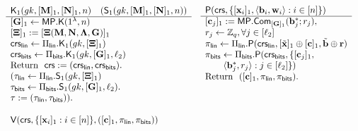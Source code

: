  
   
\begin{figure}
\begin{\algSize}
$$
\begin{array}{ll}
\begin{array}{l}
\algK_1(\gk,[\matr{M}]_1,[\matr{N}]_1,n)
\quad (\mathsf{S}_1(\gk,[\matr{M}]_1,[\matr{N}]_1,n))
\\
\hline
[\matr{G}]_1 \gets \MP.\algK(1^\lambda,n)\\
{[\matr{\Xi}]_1 := [\matr{\Xi}(\matr{M},\matr{N},\matr{\Lambda},\matr{G})]_1}\\
\crs_\sflin\gets\Pi_\sflin.\algK_1(\gk,[\matr{\Xi}]_1)\\
\crs_\sfbits\gets\Pi_\sfbits.\algK_1(\gk,[\matr{G}]_1,\lb)\\
\text{Return } \ \crs:=(\crs_\sflin,\crs_\sfbits).\\
(\tau_\sflin\gets\Pi_\sflin.\algS_1(\gk,[\matr{\Xi}]_1)\\
\tau_\sfbits\gets\Pi_\sfbits.\algS_1(\gk,[\matr{G}]_1,\lb).\\
\tau := (\tau_\sflin,\tau_\sfbits)).\\
\\
\end{array}
&
\begin{array}{l}
{\algP(\mathsf{crs}, \{[\vecb{x}_i]_1,\langle \vecb{b}_i,\vecb{w}_i\rangle:i\in[n]\})}\\
\hline
{[\vecb{c}_j]_1} := \MP.\Com_{[\matr{G}]_1}(\vecb{b}_j^*;r_j),\\
r_j \gets\Z_q, \forall j\in[\lb]\\
\pi_\sflin \gets 
    \Pi_\sflin.\algP
    (
        \crs_\sflin,
            [\tvecb{x}]_1\oplus
            [\vecb{c}]_1,
            \tilde{\vecb{b}}\oplus\vecb{r}
    )\\
\pi_\sfbits \gets
    \Pi_\sfbits.\algP
    (
        \crs_\sfbits,
        \{[\matr{c}_j]_1,\\
\qquad
        \langle\matr{b}^*_j,r_j\rangle:j\in[\lb]\}
    )\\
\text{Return } \  ([\vecb{c}]_1,\pi_\sflin,\pi_\sfbits). \\
\\
\\
\\
\end{array}\\
\begin{array}{l}
{\algV(\mathsf{crs},\{[\vecb{x}_i]_1:i\in[n]\},([\vecb{c}]_1,\pi_\sflin,\pi_\sfbits))}\\

\end{array}
\end{array}$$
\end{\algSize}
\end{figure}
